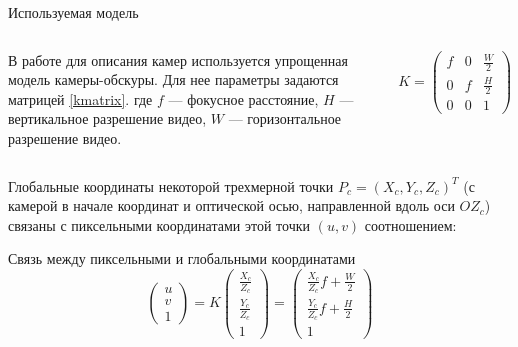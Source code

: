 \documentclass[9pt,aspectratio=169]{beamer}
\begin{document}
\begin{frame}{Используемая модель}

\begin{columns}


В работе для описания камер используется упрощенная модель
камеры-обскуры.
Для нее параметры задаются матрицей \eqref{kmatrix}.
где $f$ --- фокусное расстояние, $H$ --- вертикальное разрешение 
видео, $W$ --- горизонтальное разрешение видео.

\centering
\begin{equation}\label{kmatrix}
K =
\begin{pmatrix}
f & 0 & \frac{W}{2} \\[0.4em]
0 & f & \frac{H}{2} \\[0.4em]
0 & 0 & 1
\end{pmatrix}
\end{equation}

\end{columns}

\vspace{1.5em}


Глобальные координаты некоторой
трехмерной точки $P_c = (X_c, Y_c, Z_c)^T$ (с камерой в начале
координат и оптической осью, направленной вдоль оси $OZ_c$)
связаны с пиксельными координатами этой точки $(u, v)$ соотношением:
\begin{block}{Связь между пиксельными и глобальными координатами}
\centering
\vspace{-0.5em}
\[
\begin{pmatrix}
u \\ v \\ 1
\end{pmatrix}
= K
\begin{pmatrix}
\frac{X_c}{Z_c} \\
\frac{Y_c}{Z_c} \\
1
\end{pmatrix} = 
\begin{pmatrix}
\frac{X_c}{Z_c}f + \frac{W}{2}\\
\frac{Y_c}{Z_c}f + \frac{H}{2}\\
1
\end{pmatrix}
\]
\end{block}

\end{frame}
\end{document}
